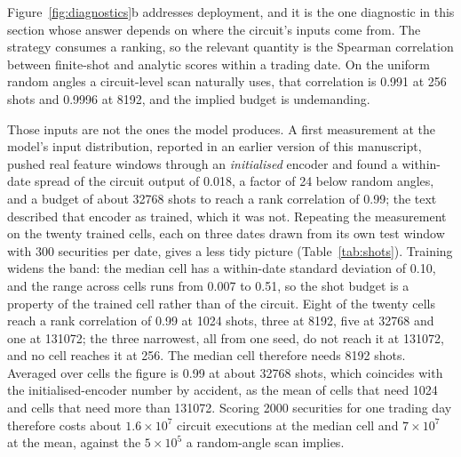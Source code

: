Figure~\ref{fig:diagnostics}b addresses deployment, and it is the one diagnostic in
this section whose answer depends on where the circuit's inputs come from. The
strategy consumes a ranking, so the relevant quantity is the Spearman
correlation between finite-shot and analytic scores within a trading date. On
the uniform random angles a circuit-level scan naturally uses, that correlation
is \num{0.991} at \num{256} shots and \num{0.9996} at \num{8192}, and the
implied budget is undemanding.

Those inputs are not the ones the model produces. A first measurement at
the model's input distribution, reported in an earlier version of this
manuscript, pushed real feature windows through an \emph{initialised} encoder
and found a within-date spread of the circuit output of \num{0.018}, a factor
of \num{24} below random angles, and a budget of about \num{32768} shots to
reach a rank correlation of \num{0.99}; the text described that encoder as
trained, which it was not. Repeating the measurement on the twenty trained
cells, each on three dates drawn from its own test window with \num{300}
securities per date, gives a less tidy picture (Table~\ref{tab:shots}).
Training widens the band: the median cell has a within-date standard
deviation of \num{0.10}, and the range across cells runs from \num{0.007} to
\num{0.51}, so the shot budget is a property of the trained cell rather than
of the circuit. Eight of the twenty cells reach a rank correlation of
\num{0.99} at \num{1024} shots, three at \num{8192}, five at \num{32768} and
one at \num{131072}; the three narrowest, all from one seed, do not reach it at
\num{131072}, and no cell reaches it at \num{256}. The median cell therefore
needs \num{8192} shots. Averaged over cells the figure is \num{0.99} at about
\num{32768} shots, which coincides with the initialised-encoder number by
accident, as the mean of cells that need \num{1024} and cells that need more
than \num{131072}. Scoring \num{2000} securities for one trading day
therefore costs about $1.6\times10^{7}$ circuit executions at the median cell
and $7\times10^{7}$ at the mean, against the $5\times10^{5}$ a random-angle
scan implies.


